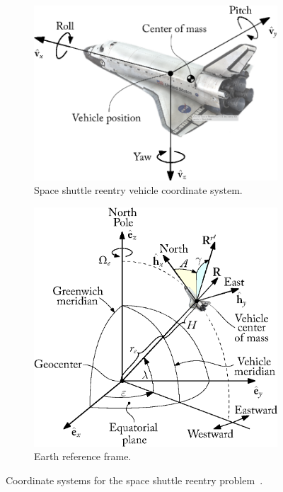 \begin{figure}[htb]
  \centering
  \begin{subfigure}[c]{0.475\textwidth}
    \centering
    \includegraphics[width=1.0\linewidth]{figures/chapter_4/shuttle_frame.eps}
    \caption{Space shuttle reentry vehicle coordinate system.}
    \label{chap4:fig:shuttle_frame}
  \end{subfigure}%
  \hfill
  \begin{subfigure}[c]{0.475\textwidth}
    \centering
    \includegraphics[width=1.0\linewidth]{figures/chapter_4/earth_frame.eps}
    \caption{Earth reference frame.}
    \label{chap4:fig:earth_frame}
  \end{subfigure}
  \caption{Coordinate systems for the space shuttle reentry problem~\cite{brenan1995numerical, brenan1986numerical}.}
  \label{chap4:fig:shuttle_reentry}
\end{figure}

